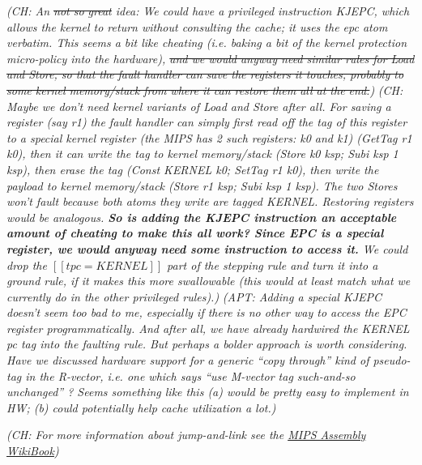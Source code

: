 \documentclass{article}
\newcommand{\ch}[1]{{\color{dkblue}\em (CH: #1)}}
\newcommand{\apt}[1]{{\color{red}\em (APT: #1)}}
\newcommand*{\EG}{e.g.,\xspace}
\begin{document}
\ch{An \sout{not so great} idea: We could have a privileged instruction
  KJEPC, which allows the kernel to return without consulting the
  cache; it uses the epc atom verbatim. This seems a bit like cheating
  (i.e. baking a bit of the kernel protection micro-policy into the
  hardware), \sout{and we would anyway need similar rules for Load and
    Store, so that the fault handler can save the registers it
    touches, probably to some kernel memory/stack from where it can
    restore them all at the end.}}
\ch{Maybe we don't need kernel variants of Load and Store after
  all. For saving a register (say r1) the fault handler can simply
  first read off the tag of this register to a special kernel register
  (the MIPS has 2 such registers: k0 and k1) (GetTag r1 k0), then it
  can write the tag to kernel memory/stack (Store k0 ksp; Subi ksp 1
  ksp), then erase the tag (Const KERNEL k0; SetTag r1 k0), then write
  the payload to kernel memory/stack (Store r1 ksp; Subi ksp 1
  ksp). The two Stores won't fault because both atoms they write are
  tagged KERNEL. Restoring registers would be analogous. {\bf So is
    adding the KJEPC instruction an acceptable amount of cheating to
    make this all work? Since EPC is a special register, we would
    anyway need some instruction to access it.} We could drop the
  $[[tpc = KERNEL]]$ part of the stepping rule and turn it into a
  ground rule, if it makes this more swallowable (this would at
  least match what we currently do in the other privileged rules).}
\apt{Adding a special KJEPC doesn't seem too bad to me, especially if there is
no other way to access the EPC register programmatically. And after all,
we have already hardwired the KERNEL pc tag into the faulting rule.
But perhaps a bolder approach is worth considering.
Have we discussed hardware support
for a generic ``copy through'' kind of pseudo-tag in the R-vector, 
i.e. one which says ``use M-vector tag such-and-so unchanged'' ?
Seems something like this (a) would be pretty easy to implement in HW; 
(b) could potentially help cache utilization a lot.}


\ch{For more information about jump-and-link see the
  \href{https://en.wikibooks.org/wiki/MIPS_Assembly/Control_Flow_Instructions}{MIPS
    Assembly WikiBook}}
\end{document}
